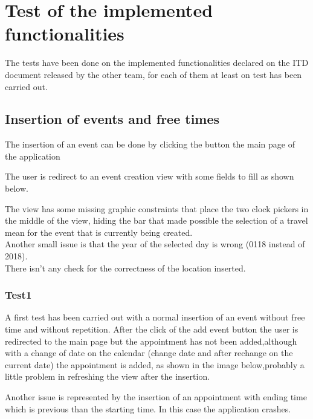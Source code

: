 \chapter{Test of the implemented functionalities}

The tests have been done on the implemented functionalities declared on the ITD document released by the other team, for each of them at least on test has been carried out.

\section{Insertion of events and free times}

The insertion of an event can be done by clicking the button the main page of the application


The user is redirect to an event creation view with some fields to fill as shown below.


The view has some missing graphic constraints that place the two clock pickers in the middle of the view, hiding the bar that made possible the selection of a travel mean for the event that is currently being created.\\
Another small issue is that the year of the selected day is wrong (0118 instead of 2018).\\
There isn't any check for the correctness of the location inserted.\\
\subsection{Test1}
A first test has been carried out with a normal insertion of an event without free time and without repetition.
After the click of the add event button the user is redirected to the main page but the appointment has not been added,although with a change of date on the calendar (change date and after rechange on the current date) the appointment is added, as shown in the image below,probably a little problem in refreshing the view after the insertion.


Another issue is represented by the insertion of an appointment with ending time which is previous than the starting time. In this case the application crashes.

